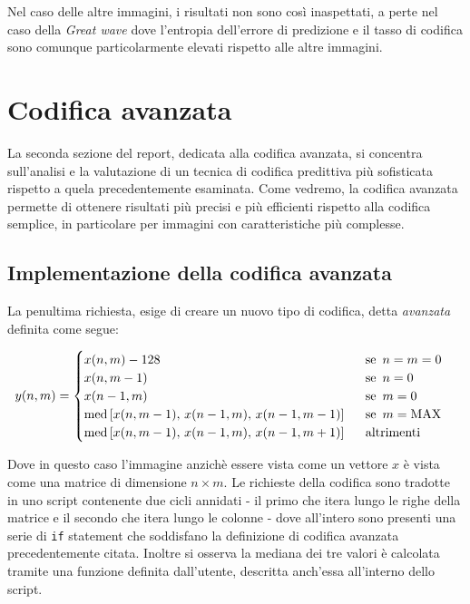 Nel caso delle altre immagini, i risultati non sono così inaspettati, a perte nel caso della \textsl{Great wave} dove l'entropia dell'errore di predizione e il tasso di codifica sono comunque particolarmente elevati rispetto alle altre immagini.





\newpage\section{Codifica avanzata}
La seconda sezione del report, dedicata alla codifica avanzata, si concentra sull'analisi e la valutazione di un tecnica di codifica predittiva più sofisticata rispetto a quela precedentemente esaminata. Come vedremo, la codifica avanzata permette di ottenere risultati più precisi e più efficienti rispetto alla codifica semplice, in particolare per immagini con caratteristiche più complesse.

\vspace{15px}\subsection{Implementazione della codifica avanzata}

La penultima richiesta, esige di creare un nuovo tipo di codifica, detta \textsl{avanzata} definita come segue:

\begin{gather*}
    y(n, m) = 
    \begin{cases}
        x(n, m) - 128 \hspace{161px} \text{se } \, n = m = 0 \\
        x(n, m - 1) \hspace{171px} \text{se } \, n = 0\\
        x(n - 1, m) \hspace{171px} \text{se } \, m = 0\\
        \text{med}\left[ x(n, m - 1),\, x(n - 1, m),\, x(n - 1, m - 1) \right] \hspace{15px} \text{se } \, m = \text{MAX}\\
        \text{med}\left[ x(n, m - 1),\, x(n - 1, m),\, x(n - 1, m + 1) \right] \hspace{15px} \text{altrimenti}
    \end{cases}
\end{gather*} 

\noindent Dove in questo caso l'immagine anzichè essere vista come un vettore $x$ è vista come una matrice di dimensione $n \times m$. Le richieste della codifica sono tradotte in uno script contenente due cicli annidati - il primo che itera lungo le righe della matrice e il secondo che itera lungo le colonne - dove all'intero sono presenti una serie di \texttt{if} statement che soddisfano la definizione di codifica avanzata precedentemente citata. Inoltre si osserva la mediana dei tre valori è calcolata tramite una funzione definita dall'utente, descritta anch'essa all'interno dello script. 


